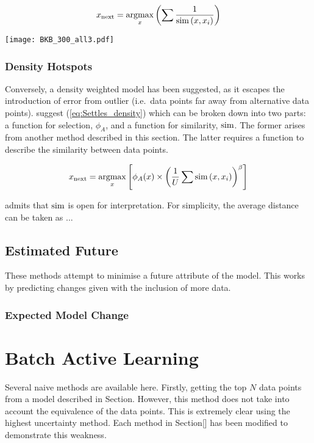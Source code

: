 \begin{equation}
  \label{eq:inverseSim}
  x_\mathrm{next}=\operatorname*{argmax}_x{\left(\sum{\frac{1}{\operatorname*{sim}{(x, x_i)}}}\right)}
\end{equation}

\begin{center}
  \texttt{[image: BKB\_300\_all3.pdf]}
\end{center}

\subsubsection{Density Hotspots}
Conversely, a density weighted model has been suggested, as it escapes the introduction of error from outlier (i.e.\ data points far away from alternative data points). \textcite{Set08} suggest (\ref{eq:Settles_density}) which can be broken down into two parts: a function for selection, $\phi_A$, and a function for similarity, $\operatorname*{sim}$. The former arises from  another method described in this section. The latter requires a function to describe the similarity between data points.

\begin{equation}
  \label{eq:Settles_density}
  x_\mathrm{next}=\operatorname*{argmax}_x{\left[\phi_A(x)\times{\left(\frac{1}{U}\sum{\operatorname*{sim}{(x, x_i)}}\right)}^\beta\right]}
\end{equation}

\textcite{Set08} admits that $\operatorname*{sim}$ is open for interpretation. For simplicity, the average distance can be taken as ...


\subsection{Estimated Future}
These methods attempt to minimise a future attribute of the model. This works by predicting changes given with the inclusion of more data.

\subsubsection{Expected Model Change}

\section{Batch Active Learning}
Several naive methods are available here. Firstly, getting the top $N$ data points from a model described in Section. However, this method does not take into account the equivalence of the data points. This is extremely clear using the highest uncertainty method. Each method in Section[] has been modified to demonstrate this weakness.

